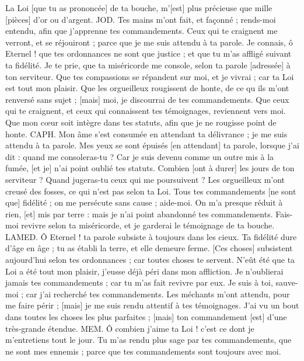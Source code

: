 \begin{multicols}{2}
La Loi [que tu as prononcée] de ta bouche, m'[est] plus précieuse que mille [pièces] d'or ou d'argent.
JOD. Tes mains m'ont fait, et façonné ; rends-moi entendu, afin que j'apprenne tes commandements.
Ceux qui te craignent me verront, et se réjouiront ; parce que je me suis attendu à ta parole.
Je connais, ô Eternel ! que tes ordonnances ne sont que justice ; et que tu m'as affligé suivant ta fidélité.
Je te prie, que ta miséricorde me console, selon ta parole [adressée] à ton serviteur.
Que tes compassions se répandent sur moi, et je vivrai ; car ta Loi est tout mon plaisir.
Que les orgueilleux rougissent de honte, de ce qu ils m'ont renversé sans sujet ; [mais] moi, je discourrai de tes commandements.
Que ceux qui te craignent, et ceux qui connaissent tes témoignages, reviennent vers moi.
Que mon cœur soit intègre dans tes statuts, afin que je ne rougisse point de honte.
CAPH. Mon âme s'est consumée en attendant ta délivrance ; je me suis attendu à ta parole.
Mes yeux se sont épuisés [en attendant] ta parole, lorsque j'ai dit : quand me consoleras-tu ?
Car je suis devenu comme un outre mis à la fumée, [et je] n'ai point oublié tes statuts.
Combien [ont à durer] les jours de ton serviteur ? Quand jugeras-tu ceux qui me poursuivent ?
Les orgueilleux m'ont creusé des fosses, ce qui n'est pas selon ta Loi.
Tous tes commandements [ne sont que] fidélité ; on me persécute sans cause ; aide-moi.
On m'a presque réduit à rien, [et] mis par terre : mais je n'ai point abandonné tes commandements.
Fais-moi revivre selon ta miséricorde, et je garderai le témoignage de ta bouche.
LAMED. Ô Eternel ! ta parole subsiste à toujours dans les cieux.
Ta fidélité dure d'âge en âge ; tu as établi la terre, et elle demeure ferme.
[Ces choses] subsistent aujourd'hui selon tes ordonnances ; car toutes choses te servent.
N'eût été que ta Loi a été tout mon plaisir, j'eusse déjà péri dans mon affliction.
Je n'oublierai jamais tes commandements ; car tu m'as fait revivre par eux.
Je suis à toi, sauve-moi ; car j'ai recherché tes commandements.
Les méchants m'ont attendu, pour me faire périr ; [mais] je me suis rendu attentif à tes témoignages.
J'ai vu un bout dans toutes les choses les plus parfaites ; [mais] ton commandement [est] d'une très-grande étendue.
MEM. Ô combien j'aime ta Loi ! c'est ce dont je m'entretiens tout le jour.
Tu m'as rendu plus sage par tes commandements, que ne sont mes ennemis ; parce que tes commandements sont toujours avec moi.

\end{multicols}
